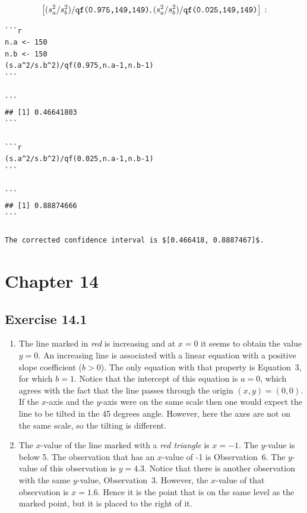 \documentclass[]{krantz}
\theoremstyle{definition}
\theoremstyle{definition}
\theoremstyle{definition}
\theoremstyle{remark}
\begin{document}
\[\big[(s_a^2/s_b^2)/\mbox{\texttt{qf(0.975,149,149)}} , (s_a^2/s_b^2)/\mbox{\texttt{qf(0.025,149,149)}}\big]\,:\]

\begin{verbatim}
```r
n.a <- 150
n.b <- 150
(s.a^2/s.b^2)/qf(0.975,n.a-1,n.b-1)
```

```
## [1] 0.46641803
```

```r
(s.a^2/s.b^2)/qf(0.025,n.a-1,n.b-1)
```

```
## [1] 0.88874666
```

The corrected confidence interval is $[0.466418, 0.8887467]$.
\end{verbatim}

\hypertarget{chapter-14}{%
\section*{Chapter 14}\label{chapter-14}}


\hypertarget{exercise-14.1}{%
\subsection*{Exercise 14.1}\label{exercise-14.1}}


\begin{enumerate}
\def\labelenumi{\arabic{enumi}.}
\item
  The line marked in \emph{red} is
  increasing and at \(x=0\) it seems to obtain the value \(y=0\). An
  increasing line is associated with a linear equation with a positive
  slope coefficient (\(b > 0\)). The only equation with that property is
  Equation~3, for which \(b=1\). Notice that the intercept of this equation
  is \(a = 0\), which agrees with the fact that the line passes through the
  origin \((x,y) = (0,0)\). If the \(x\)-axis and the \(y\)-axis were on the
  same scale then one would expect the line to be tilted in the 45 degrees
  angle. However, here the axes are not on the same scale, so the tilting
  is different.
\item
  The \(x\)-value of the line marked
  with a \emph{red triangle} is \(x=-1\). The \(y\)-value is below 5. The
  observation that has an \(x\)-value of -1 is Observation~6. The \(y\)-value
  of this observation is \(y=4.3\). Notice that there is another observation
  with the same \(y\)-value, Observation~3. However, the \(x\)-value of that
  observation is \(x=1.6\). Hence it is the point that is on the same level
  as the marked point, but it is placed to the right of it.
\end{enumerate}
\end{document}
